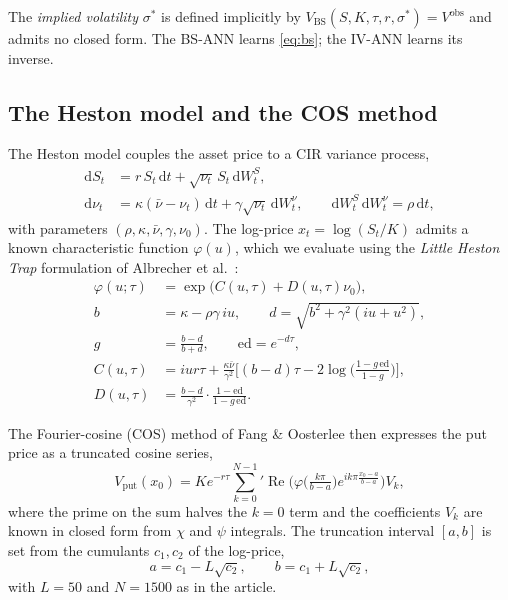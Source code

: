\documentclass[11pt,a4paper]{article}
\newcommand{\bs}{\mathrm{BS}}
\begin{document}
The \emph{implied volatility} $\sigma^*$ is defined implicitly by
$V_{\bs}(S, K, \tau, r, \sigma^*) = V^{\text{obs}}$ and admits no closed form.
The BS-ANN learns \eqref{eq:bs}; the IV-ANN learns its inverse.

\subsection{The Heston model and the COS method}
\label{sec:cos}

The Heston model \cite{heston1993} couples the asset price to a CIR variance
process,
\begin{align}
\mathrm{d}S_t &= r\, S_t\, \mathrm{d}t + \sqrt{\nu_t}\, S_t\, \mathrm{d}W_t^S, \\
\mathrm{d}\nu_t &= \kappa(\bar\nu - \nu_t)\, \mathrm{d}t
+ \gamma\sqrt{\nu_t}\, \mathrm{d}W_t^\nu,
\qquad \mathrm{d}W_t^S\, \mathrm{d}W_t^\nu = \rho\, \mathrm{d}t,
\end{align}
with parameters $(\rho, \kappa, \bar\nu, \gamma, \nu_0)$. The log-price
$x_t = \log(S_t/K)$ admits a known characteristic function $\varphi(u)$,
which we evaluate using the \emph{Little Heston Trap} formulation of
Albrecher et al.\ \cite{albrecher2007}:
\begin{align}
\varphi(u; \tau) &= \exp\!\big(C(u,\tau) + D(u,\tau)\nu_0\big),\\
b &= \kappa - \rho\gamma\, iu, \qquad d = \sqrt{b^2 + \gamma^2(iu + u^2)},\\
g &= \frac{b - d}{b + d}, \qquad \mathrm{ed} = e^{-d\tau},\\
C(u,\tau) &= iur\tau + \frac{\kappa\bar\nu}{\gamma^2}\Big[(b - d)\tau
    - 2\log\!\Big(\frac{1 - g\, \mathrm{ed}}{1 - g}\Big)\Big],\\
D(u,\tau) &= \frac{b - d}{\gamma^2}\cdot \frac{1 - \mathrm{ed}}{1 - g\, \mathrm{ed}}.
\end{align}

The Fourier-cosine (COS) method of Fang \& Oosterlee \cite{fang2009} then
expresses the put price as a truncated cosine series,
\begin{equation}
V_{\text{put}}(x_0) = K e^{-r\tau} \sum_{k=0}^{N-1} {}' \operatorname{Re}\!\Big(
\varphi\!\Big(\tfrac{k\pi}{b-a}\Big) e^{ik\pi\frac{x_0 - a}{b-a}} \Big)
V_k,
\label{eq:cos}
\end{equation}
where the prime on the sum halves the $k=0$ term and the coefficients
$V_k$ are known in closed form from $\chi$ and $\psi$ integrals. The
truncation interval $[a, b]$ is set from the cumulants
$c_1, c_2$ of the log-price,
\begin{equation}
a = c_1 - L\sqrt{c_2}, \qquad b = c_1 + L\sqrt{c_2},
\end{equation}
with $L=50$ and $N=1500$ as in the article.
\end{document}
